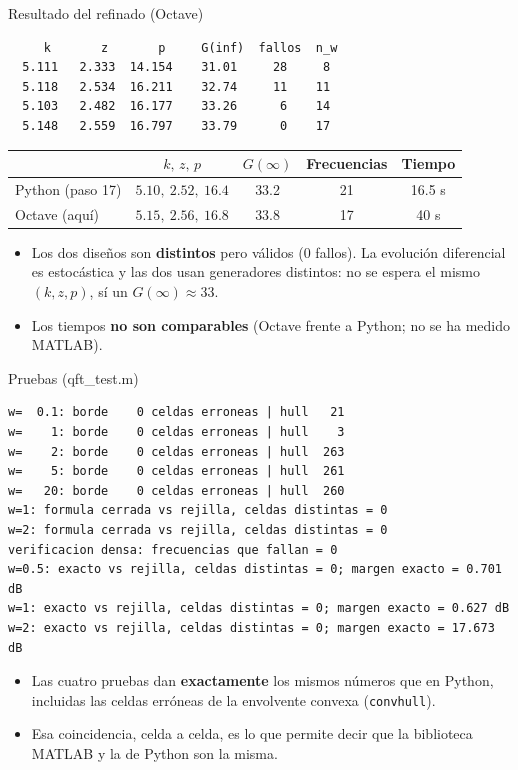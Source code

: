 \documentclass[aspectratio=169,11pt]{beamer}
\begin{document}
\begin{frame}[fragile]{Resultado del refinado (Octave)}
  \footnotesize
  \begin{verbatim}
     k       z       p     G(inf)  fallos  n_w
  5.111   2.333  14.154    31.01     28     8
  5.118   2.534  16.211    32.74     11    11
  5.103   2.482  16.177    33.26      6    14
  5.148   2.559  16.797    33.79      0    17
  \end{verbatim}
  \begin{center}
  \begin{tabular}{l|c|c|c|c}
    & $k,\,z,\,p$ & $G(\infty)$ & Frecuencias & Tiempo\\\hline
    Python (paso 17) & $5.10,\ 2.52,\ 16.4$ & 33.2 & 21 & 16.5 s\\
    Octave (aquí) & $5.15,\ 2.56,\ 16.8$ & 33.8 & 17 & 40 s
  \end{tabular}
  \end{center}
  \begin{itemize}
    \item Los dos diseños son \textbf{distintos} pero válidos (0 fallos). La evolución diferencial es estocástica y las dos usan generadores distintos: no se espera el mismo $(k,z,p)$, sí un $G(\infty)\approx33$.
    \item Los tiempos \textbf{no son comparables} (Octave frente a Python; no se ha medido MATLAB).
  \end{itemize}
\end{frame}

\begin{frame}[fragile]{Pruebas (qft\_test.m)}
  \footnotesize
  \begin{verbatim}
w=  0.1: borde    0 celdas erroneas | hull   21
w=    1: borde    0 celdas erroneas | hull    3
w=    2: borde    0 celdas erroneas | hull  263
w=    5: borde    0 celdas erroneas | hull  261
w=   20: borde    0 celdas erroneas | hull  260
w=1: formula cerrada vs rejilla, celdas distintas = 0
w=2: formula cerrada vs rejilla, celdas distintas = 0
verificacion densa: frecuencias que fallan = 0
w=0.5: exacto vs rejilla, celdas distintas = 0; margen exacto = 0.701 dB
w=1: exacto vs rejilla, celdas distintas = 0; margen exacto = 0.627 dB
w=2: exacto vs rejilla, celdas distintas = 0; margen exacto = 17.673 dB
  \end{verbatim}
  \begin{itemize}
    \item Las cuatro pruebas dan \textbf{exactamente} los mismos números que en Python, incluidas las celdas erróneas de la envolvente convexa (\texttt{convhull}).
    \item Esa coincidencia, celda a celda, es lo que permite decir que la biblioteca MATLAB y la de Python son la misma.
  \end{itemize}
\end{frame}
\end{document}
